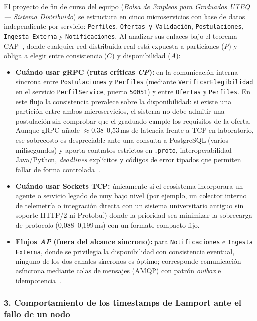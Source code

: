 \documentclass[12pt,a4paper]{article}
\begin{document}
El proyecto de fin de curso del equipo (\emph{Bolsa de Empleos para Graduados UTEQ --- Sistema Distribuido}) se estructura en cinco microservicios con base de datos independiente por servicio: \texttt{Perfiles}, \texttt{Ofertas y Validación}, \texttt{Postulaciones}, \texttt{Ingesta Externa} y \texttt{Notificaciones}. Al analizar sus enlaces bajo el teorema CAP~\cite{khoshaba2023cap}, donde cualquier red distribuida real está expuesta a particiones ($P$) y obliga a elegir entre consistencia ($C$) y disponibilidad ($A$):
\begin{itemize}
  \item \textbf{Cuándo usar gRPC (rutas críticas \emph{CP}):} en la comunicación interna síncrona entre \texttt{Postulaciones} y \texttt{Perfiles} (mediante \texttt{VerificarElegibilidad} en el servicio \texttt{PerfilService}, puerto \texttt{50051}) y entre \texttt{Ofertas} y \texttt{Perfiles}. En este flujo la consistencia prevalece sobre la disponibilidad: si existe una partición entre ambos microservicios, el sistema no debe admitir una postulación sin comprobar que el graduado cumple los requisitos de la oferta. Aunque gRPC añade $\approx$0,38--0,53\,ms de latencia frente a TCP en laboratorio, ese sobrecosto es despreciable ante una consulta a PostgreSQL (varios milisegundos) y aporta contratos estrictos en \texttt{.proto}, interoperabilidad Java/Python, \emph{deadlines} explícitos y códigos de error tipados que permiten fallar de forma controlada~\cite{niswar2024performance,zhu2025rethinking}.
  \item \textbf{Cuándo usar Sockets TCP:} únicamente si el ecosistema incorporara un agente o servicio legado de muy bajo nivel (por ejemplo, un colector interno de telemetría o integración directa con un sistema universitario antiguo sin soporte HTTP/2 ni Protobuf) donde la prioridad sea minimizar la sobrecarga de protocolo (0,088--0,199\,ms) con un formato compacto fijo.
  \item \textbf{Flujos \emph{AP} (fuera del alcance síncrono):} para \texttt{Notificaciones} e \texttt{Ingesta Externa}, donde se privilegia la disponibilidad con consistencia eventual, ninguno de los dos canales síncronos es óptimo; corresponde comunicación asíncrona mediante colas de mensajes (AMQP) con patrón \emph{outbox} e idempotencia~\cite{mohammad2025resilient}.
\end{itemize}

\subsubsection{3. Comportamiento de los timestamps de Lamport ante el fallo de un nodo}
\end{document}
